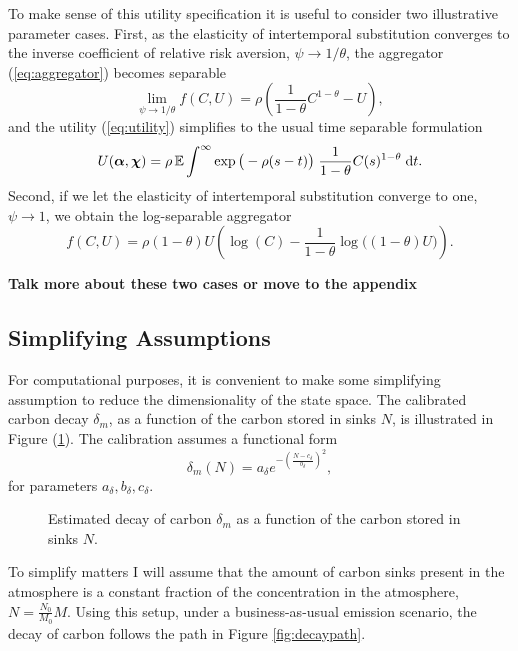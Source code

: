 \documentclass[../../main.tex]{subfiles}
\begin{document}
To make sense of this utility specification it is useful to consider two illustrative parameter cases. First, as the elasticity of intertemporal substitution converges to the inverse  coefficient of relative risk aversion, $\psi \to 1 / \theta$, the aggregator (\ref{eq:aggregator}) becomes separable \begin{equation}
    \lim_{\psi \to 1 / \theta} f(C, U) = \rho \left(\frac{1}{1 - \theta} C^{1 - \theta} - U\right),
\end{equation} and the utility (\ref{eq:utility}) simplifies to the usual time separable formulation \begin{equation}
    U(\bm{\alpha}, \bm{\chi}) = \rho\operatorname{\mathbb{E}} \int^{\infty} \exp\big(-\rho (s - t) \big) \; \frac{1}{1 - \theta} C(s)^{1 - \theta} \; \mathrm{d}t.
\end{equation} Second, if we let the elasticity of intertemporal substitution converge to one, $\psi \to 1$, we obtain the log-separable aggregator \begin{equation}
    f(C, U) = \rho (1 - \theta)U \left(\log(C) - \frac{1}{1 - \theta} \log\big( (1 - \theta) U \big) \right).
\end{equation}

\textbf{Talk more about these two cases or move to the appendix}

\subsection{Simplifying Assumptions}

For computational purposes, it is convenient to make some simplifying assumption to reduce the dimensionality of the state space. The calibrated carbon decay $\delta_m$, as a function of the carbon stored in sinks $N$, is illustrated in Figure (\ref{fig:decay}). The calibration assumes a functional form \begin{equation}
    \delta_m(N) = a_{\delta} e^{-\left(\frac{N - c_{\delta}}{b_{\delta}}\right)^2},
\end{equation} for parameters $a_{\delta}, b_{\delta}, c_{\delta}$.

\begin{figure}[H]
    \centering
    \caption{Estimated decay of carbon $\delta_m$ as a  function of the carbon stored in sinks $N$.}
    \label{fig:decay}
\end{figure}

To simplify matters I will assume that the amount of carbon sinks present in the atmosphere is a constant fraction of the concentration in the atmosphere, $N = \frac{N_0}{M_0} M$. Using this setup, under a business-as-usual emission scenario, the decay of carbon follows the path in Figure \ref{fig:decaypath}.
\end{document}
